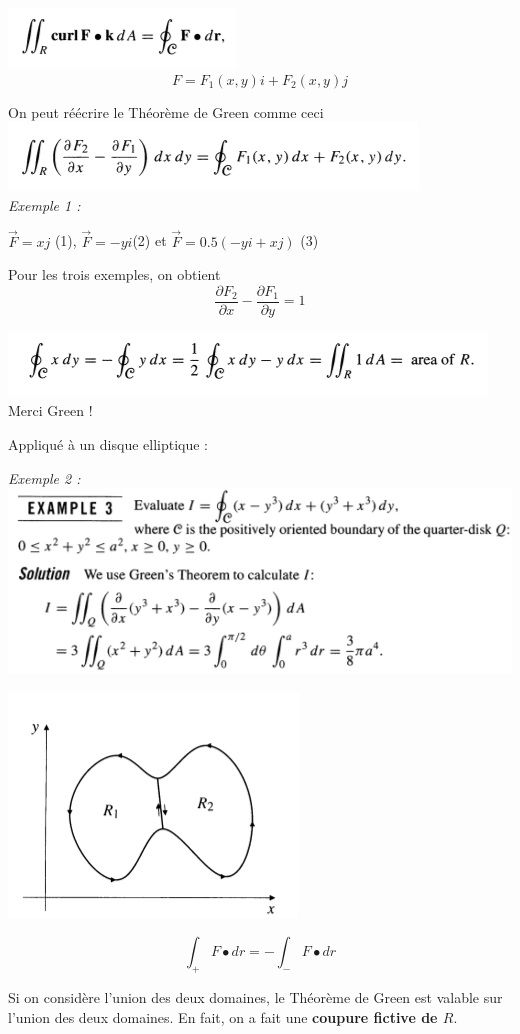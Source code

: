 \includegraphics[scale=0.7]{image4.png}\\

\[F=F_1(x,y)i+F_2(x,y)j\]

On peut réécrire le Théorème de Green comme ceci\\
\includegraphics[scale=0.7]{image5.png}\\
\textit{
Exemple 1 : }

$\vec F=xj$ (1), $\vec F = -y i$(2) et $\vec F = 0.5 ( -y i +x j )$ (3)

Pour les trois exemples, on obtient \[\frac{\partial F_2}{\partial x}- \frac{\partial F_1}{\partial y} = 1\]

\includegraphics[scale=0.7]{image6.png}\\

Merci Green !

Appliqué à un disque elliptique :

\textit{
Exemple 2 : }\\
\includegraphics[scale=0.7]{image7.png}\\

\begin{myrem}

\includegraphics[scale=0.8]{image8.png}

\[\int_+ F\bullet dr = - \int_- F\bullet dr\]

Si on considère l'union des deux domaines, le Théorème de Green est valable sur l'union des deux domaines. En fait, on a fait une \textbf{coupure fictive de $R$}.
\end{myrem}

